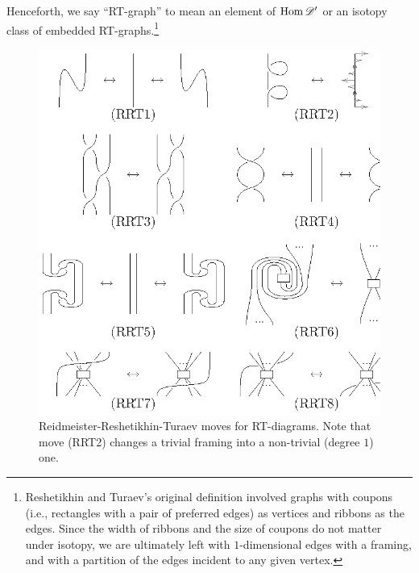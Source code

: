 Henceforth, we say ``RT-graph'' to mean an element of $\operatorname{Hom}\mathscr{D}'_{}$ or an
isotopy class of embedded RT-graphs.\footnote{Reshetikhin and Turaev's
  original definition involved graphs with coupons (i.e., rectangles
  with a pair of preferred edges) as vertices and ribbons as the
  edges. Since the width of ribbons and the size of coupons do not
  matter under isotopy, we are ultimately left with $1$-dimensional
  edges with a framing, and with a partition of the edges incident to
  any given vertex.}
\begin{figure}[htbp]
  \centering
  \includegraphics{fig-003}
    \caption{Reidmeister-Reshetikhin-Turaev moves for
      RT-diagrams. Note that move (RRT2) changes a trivial framing
      into a non-trivial (degree $1$) one.}
    \label{fig:rrt}
\end{figure}

